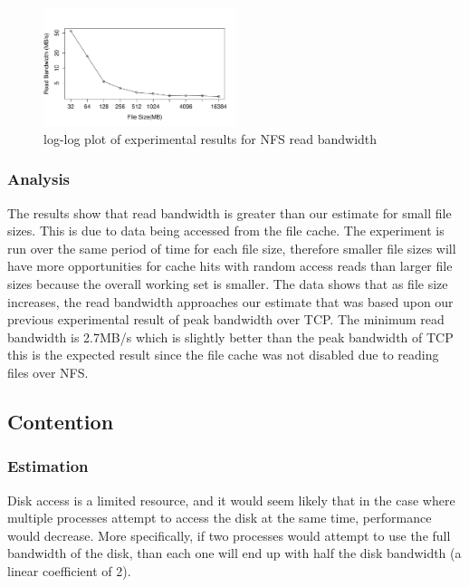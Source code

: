\begin{figure}
    \centering
    \includegraphics[width=0.5\textwidth]{nfsresults.pdf}
    \caption{log-log plot of experimental results for NFS read bandwidth}
    \label{figure:nfsresult}
\end{figure}

\subsubsection{Analysis}

The results show that read bandwidth is greater than our estimate for small
file sizes. This is due to data being accessed from the file cache.  The
experiment is run over the same period of time for each file size, therefore
smaller file sizes will have more opportunities for cache hits with random
access reads than larger file sizes because the overall working set is smaller.
The data shows that as file size increases, the read bandwidth approaches our
estimate that was based upon our previous experimental result of peak bandwidth
over TCP. The minimum read bandwidth is 2.7MB/s which is slightly better than
the peak bandwidth of TCP this is the expected result since the file cache was
not disabled due to reading files over NFS.

\subsection{Contention}

\subsubsection{Estimation}

Disk access is a limited resource, and it would seem likely that in the case where multiple processes attempt to access the disk at the same time, performance would decrease. More specifically, if two processes would attempt to use the full bandwidth of the disk, than each one will end up with half the disk bandwidth (a linear coefficient of 2).

